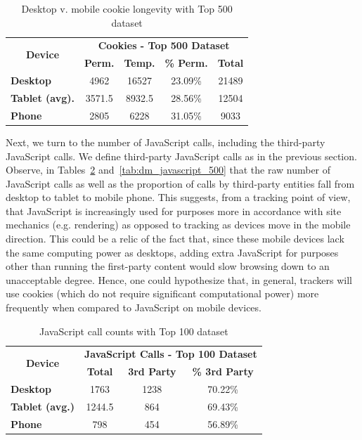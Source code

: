 \documentclass{acm_proc_article-sp}
\begin{document}
\begin{table}[htbp]
  \centering
  \caption{Desktop v. mobile cookie longevity with Top 500 dataset}
    \begin{tabular}{|c|c|c|c|c|}
    \hline
    \multicolumn{1}{|c|}{\multirow{2}[4]{*}{\textbf{Device}}} & \multicolumn{4}{|c|}{\textbf{Cookies - Top 500 Dataset}} \\ \cline{2-5}
    \multicolumn{1}{|c|}{} & \textbf{Perm.} & \textbf{Temp.} & \textbf{\% Perm.} & \textbf{Total} \\ \hline
    \multicolumn{1}{|l|}{\textbf{Desktop}} & 4962  & 16527  & 23.09\% & 21489 \\
    \multicolumn{1}{|l|}{\textbf{Tablet (avg).}} & 3571.5  & 8932.5  & 28.56\% & 12504 \\
    \multicolumn{1}{|l|}{\textbf{Phone}}  & 2805  & 6228  & 31.05\% & 9033 \\  \hline
    \end{tabular}%
  \label{tab:dm_cookie_longeivity}%
\end{table}%

Next, we turn to the number of JavaScript calls, including the third-party JavaScript calls. We define third-party JavaScript calls as in the previous section. Observe, in Tables~\ref{tab:dm_javascript_100} and~\ref{tab:dm_javascript_500} that the raw number of JavaScript calls as well as the proportion of calls by third-party entities fall from desktop to tablet to mobile phone. This suggests, from a tracking point of view, that JavaScript is increasingly used for purposes more in accordance with site mechanics (e.g. rendering) as opposed to tracking as devices move in the mobile direction. This could be a relic of the fact that, since these mobile devices lack the same computing power as desktops, adding extra JavaScript for purposes other than running the first-party content would slow browsing down to an unacceptable degree. Hence, one could hypothesize that, in general, trackers will use cookies (which do not require significant computational power) more frequently when compared to JavaScript on mobile devices.


\begin{table}[htbp]
  \centering
  \caption{JavaScript call counts with Top 100 dataset}
    \begin{tabular}{|c|c|c|c|}
    \hline
    \multicolumn{1}{|c|}{\multirow{2}[4]{*}{\textbf{Device}}} & \multicolumn{3}{|c|}{\textbf{JavaScript Calls - Top 100 Dataset}} \\ \cline{2-4}
    \multicolumn{1}{|c|}{} & \multicolumn{1}{|c|}{\textbf{Total}} & \multicolumn{1}{|c|}{\textbf{3rd Party}} & \multicolumn{1}{|c|}{\textbf{\% 3rd Party}}  \\ \hline
    \multicolumn{1}{|l|}{\textbf{Desktop}} & 1763   & 1238  & 70.22\% \\
    \multicolumn{1}{|l|}{\textbf{Tablet (avg.)}} & 1244.5   & 864 & 69.43\%  \\
    \multicolumn{1}{|l|}{\textbf{Phone}} & 798  & 454  & 56.89\% \\ \hline
    \end{tabular}%
  \label{tab:dm_javascript_100}%
\end{table}%
\end{document}
